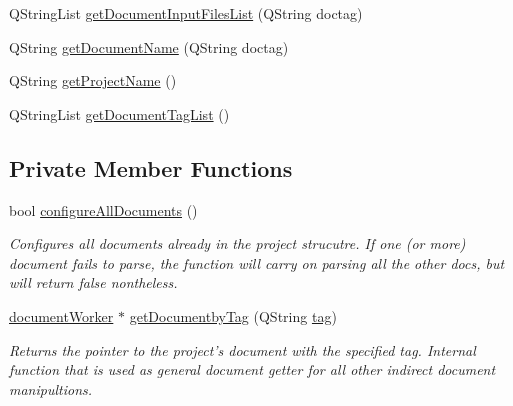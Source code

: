 \begin{DoxyCompactItemize}
Q\+String\+List \hyperlink{classproject_worker_a87e5d67dc1b313ab1d0a0f48f20fbabf}{get\+Document\+Input\+Files\+List} (Q\+String doctag)
\item 
Q\+String \hyperlink{classproject_worker_aacc955ad8a4a700e677f02322d457e5c}{get\+Document\+Name} (Q\+String doctag)
\item 
Q\+String \hyperlink{classproject_worker_a111a4e4aa9a87786819792d06047fa71}{get\+Project\+Name} ()
\item 
Q\+String\+List \hyperlink{classproject_worker_aa90487309a19fddcf97555ac783089b9}{get\+Document\+Tag\+List} ()
\end{DoxyCompactItemize}
\subsection*{Private Member Functions}
\begin{DoxyCompactItemize}
\item 
bool \hyperlink{classproject_worker_a98cedd223de4c9507a6c1b0bf05eb1e6}{configure\+All\+Documents} ()
\begin{DoxyCompactList}\small\item\em Configures all documents already in the project strucutre. If one (or more) document fails to parse, the function will carry on parsing all the other docs, but will return false nontheless. \end{DoxyCompactList}\item 
\hyperlink{classdocument_worker}{document\+Worker} $\ast$ \hyperlink{classproject_worker_a11b102e3b0ae2d129aed9a2e105ff8f4}{get\+Documentby\+Tag} (Q\+String \hyperlink{classproject_worker_aba02c11fc0a014e1743feff1d8347ad2}{tag})
\begin{DoxyCompactList}\small\item\em Returns the pointer to the project's document with the specified tag. Internal function that is used as general document getter for all other indirect document manipultions. \end{DoxyCompactList}\end{DoxyCompactItemize}

